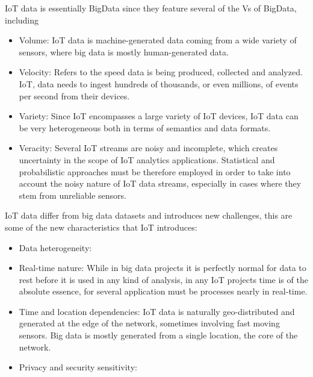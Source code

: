 IoT data is essentially BigData since they feature several of the Vs of BigData, including
\begin{itemize}
    \item Volume: IoT data is machine-generated data coming from a wide variety of sensors, where big data is mostly human-generated data.
    \item Velocity: Refers to the speed data is being produced, collected and analyzed. IoT, data needs to ingest hundreds of thousands, or even millions, of events per second from their devices.
    \item Variety: Since IoT encompasses a large variety of IoT devices, IoT data can be very heterogeneous both in terms of semantics and data formats.
    \item Veracity: Several IoT streams are noisy and incomplete, which creates
uncertainty in the scope of IoT analytics applications. Statistical and probabilistic approaches must be
therefore employed in order to take into account the noisy nature of IoT data streams, especially in
cases where they stem from unreliable sensors.
\end{itemize}

IoT data differ from big data datasets and introduces new challenges, this are some of the new characteristics that IoT introduces:

\begin{itemize}
    \item Data heterogeneity:
    \item Real-time nature: While in big data projects it is perfectly normal for data to rest before it is used in any kind of analysis, in any IoT projects time is of the absolute essence, for several application must be processes nearly in real-time.
    \item Time and location dependencies: IoT data is naturally geo-distributed and generated at the edge of the network, sometimes involving fast moving sensors. Big data is mostly generated from a single location, the core of the network.
    \item Privacy and security sensitivity:
\end{itemize}



